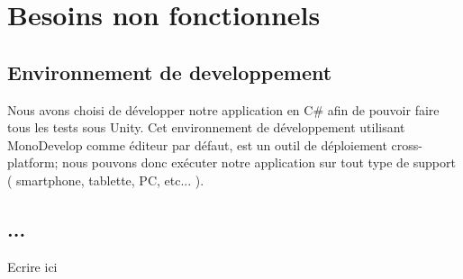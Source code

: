 \chapter{Besoins non fonctionnels}

\section{Environnement de developpement}
Nous avons choisi de développer notre application en C\# afin de pouvoir faire tous les tests sous Unity. Cet environnement de développement utilisant MonoDevelop comme éditeur par défaut, est un outil de déploiement cross-platform; nous pouvons donc exécuter notre application sur tout type de support ( smartphone, tablette, PC, etc... ).

\section{...}
Ecrire ici




\clearpage
